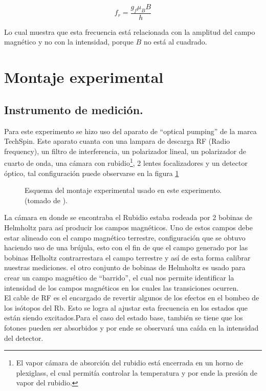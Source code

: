 \documentclass[%
 reprint,
 amsmath,amssymb,
 aps,
]{revtex4-1}
\begin{document}
\begin{equation}
    f_r=\frac{g_f\mu_B B}{h}
\end{equation}

Lo cual muestra que esta frecuencia está relacionada con la amplitud del campo magnético y no con la intensidad, porque $B$ no está al cuadrado.

\section{Montaje experimental}
\subsection{Instrumento de medición.}
Para este experimento se hizo uso del aparato de ``optical pumping'' de la marca TechSpin. Este aparato cuanta con una lampara de descarga RF (Radio frequency), un filtro de interferencia, un polarizador lineal, un polarizador de cuarto de onda, una cámara con rubidio\footnote{El vapor cámara de absorción del rubidio está encerrada en un horno de plexiglass, el cual permitía controlar la temperatura y por ende la presión de vapor del rubidio.}, 2 lentes focalizadores y un detector óptico, tal configuración puede observarse en la figura \ref{montaje experimental}
\begin{figure}[h]
\caption{\label{montaje experimental} Esquema del montaje experimental usado en este experimento.  (tomado de \cite{figura_aparato}).}
\end{figure}
La cámara en donde se encontraba el Rubidio estaba rodeada por 2 bobinas de Helmholtz para así producir los campos magnéticos. Uno de estos campos debe estar alineado con el campo magnético terrestre, configuración que se obtuvo haciendo uso de una brújula, esto con el fin de que el campo generado por las bobinas Helholtz contrarrestara el campo terrestre y así de esta forma calibrar nuestras mediciones. el otro conjunto de bobinas de Helmholtz es usado para crear un campo magnético de ``barrido'', el cual nos permite identificar la intensidad de los campos magnéticos en los cuales las transiciones ocurren.\\
El cable de RF es el encargado de revertir algunos de los efectos en el bombeo de los isótopos del Rb. Esto se logra al ajustar esta frecuencia en los estados que están siendo excitados.Para el caso del estado base, también se tiene que los fotones pueden ser absorbidos y por ende se observará una caída en la intensidad del detector.
\end{document}
